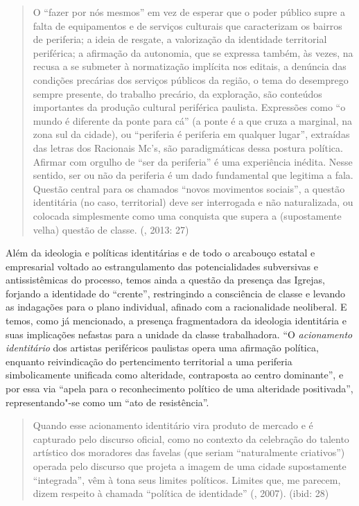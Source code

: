 \begin{quote}
O ``fazer por nós mesmos'' em vez de esperar que o poder público supre a
falta de equipamentos e de serviços culturais que caracterizam os
bairros de periferia; a ideia de resgate, a valorização da identidade
territorial periférica; a afirmação da autonomia, que se expressa
também, às vezes, na recusa a se submeter à normatização implícita nos
editais, a denúncia das condições precárias dos serviços públicos da
região, o tema do desemprego sempre presente, do trabalho precário, da
exploração, são conteúdos importantes da produção cultural periférica
paulista. Expressões como ``o mundo é diferente da ponte para cá'' (a
ponte é a que cruza a marginal, na zona sul da cidade), ou ``periferia é
periferia em qualquer lugar'', extraídas das letras dos Racionais Mc's,
são paradigmáticas dessa postura política. Afirmar com orgulho de ``ser
da periferia'' é uma experiência inédita. Nesse sentido, ser ou não da
periferia é um dado fundamental que legitima a fala. Questão central
para os chamados ``novos movimentos sociais'', a questão identitária (no
caso, territorial) deve ser interrogada e não naturalizada, ou colocada
simplesmente como uma conquista que supera a (supostamente velha)
questão de classe. (, 2013: 27)
\end{quote}

Além da ideologia e políticas identitárias e de todo o arcabouço estatal
e empresarial voltado ao estrangulamento das potencialidades subversivas
e antissistêmicas do processo, temos ainda a questão da presença das
Igrejas, forjando a identidade do ``crente'', restringindo a consciência
de classe e levando as indagações para o plano individual, afinado com a
racionalidade neoliberal. E temos, como já mencionado, a presença
fragmentadora da ideologia identitária e suas implicações nefastas para
a unidade da classe trabalhadora. ``O \emph{acionamento identitário}
dos artistas periféricos paulistas opera uma afirmação política,
enquanto reivindicação do pertencimento territorial a uma periferia
simbolicamente unificada como alteridade, contraposta ao centro
dominante'', e por essa via ``apela para o reconhecimento político de
uma alteridade positivada'', representando"-se como um ``ato de
resistência''.

\begin{quote}
Quando esse acionamento identitário vira produto de mercado e é
capturado pelo discurso oficial, como no contexto da celebração do
talento artístico dos moradores das favelas (que seriam ``naturalmente
criativos'') operada pelo discurso que projeta a imagem de uma cidade
supostamente ``integrada'', vêm à tona seus limites políticos. Limites
que, me parecem, dizem respeito à chamada ``política de identidade''
(, 2007). (ibid: 28)
\end{quote}

